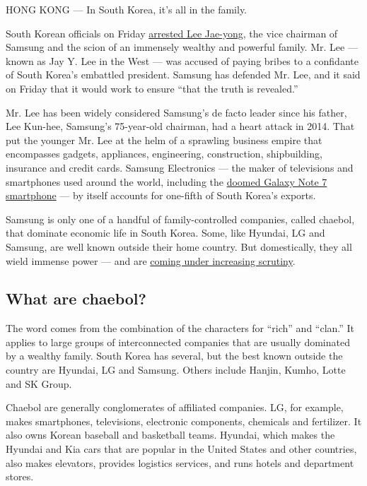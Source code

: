 HONG KONG --- In South Korea, it's all in the family.

South Korean officials on Friday
\href{https://www.nytimes.com/2017/02/16/world/asia/korea-samsung-lee-jae-yong.html}{arrested
Lee Jae-yong}, the vice chairman of Samsung and the scion of an
immensely wealthy and powerful family. Mr. Lee --- known as Jay Y. Lee
in the West --- was accused of paying bribes to a confidante of South
Korea's embattled president. Samsung has defended Mr. Lee, and it said
on Friday that it would work to ensure ``that the truth is revealed.''

Mr. Lee has been widely considered Samsung's de facto leader since his
father, Lee Kun-hee, Samsung's 75-year-old chairman, had a heart attack
in 2014. That put the younger Mr. Lee at the helm of a sprawling
business empire that encompasses gadgets, appliances, engineering,
construction, shipbuilding, insurance and credit cards. Samsung
Electronics --- the maker of televisions and smartphones used around the
world, including the
\href{https://www.nytimes.com/2017/01/23/business/samsung-galaxy-note7-fires.html}{doomed
Galaxy Note 7 smartphone} --- by itself accounts for one-fifth of South
Korea's exports.

Samsung is only one of a handful of family-controlled companies, called
chaebol, that dominate economic life in South Korea. Some, like Hyundai,
LG and Samsung, are well known outside their home country. But
domestically, they all wield immense power --- and are
\href{https://www.nytimes.com/2017/02/17/business/samsung-heir-arrested-south-korea.html}{coming
under increasing scrutiny}.

\hypertarget{what-are-chaebol}{%
\subsection{What are chaebol?}\label{what-are-chaebol}}

The word comes from the combination of the characters for ``rich'' and
``clan.'' It applies to large groups of interconnected companies that
are usually dominated by a wealthy family. South Korea has several, but
the best known outside the country are Hyundai, LG and Samsung. Others
include Hanjin, Kumho, Lotte and SK Group.

Chaebol are generally conglomerates of affiliated companies. LG, for
example, makes smartphones, televisions, electronic components,
chemicals and fertilizer. It also owns Korean baseball and basketball
teams. Hyundai, which makes the Hyundai and Kia cars that are popular in
the United States and other countries, also makes elevators, provides
logistics services, and runs hotels and department stores.

